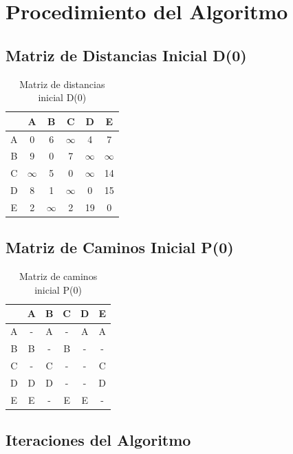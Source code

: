 \documentclass[12pt]{article}
\begin{document}
\clearpage
\section{Procedimiento del Algoritmo}
\subsection{Matriz de Distancias Inicial D(0)}
\begin{table}[h!]
\centering
\begin{tabular}{|c|c|c|c|c|c|}
\hline
 & A & B & C & D & E \\\hline
A & 0 & 6 & $\infty$ & 4 & 7 \\\hline
B & 9 & 0 & 7 & $\infty$ & $\infty$ \\\hline
C & $\infty$ & 5 & 0 & $\infty$ & 14 \\\hline
D & 8 & 1 & $\infty$ & 0 & 15 \\\hline
E & 2 & $\infty$ & 2 & 19 & 0 \\\hline
\end{tabular}
\caption{Matriz de distancias inicial D(0)}
\end{table}

\clearpage
\subsection{Matriz de Caminos Inicial P(0)}
\begin{table}[h!]
\centering
\begin{tabular}{|c|c|c|c|c|c|}
\hline
 & A & B & C & D & E \\\hline
A & - & A & - & A & A \\\hline
B & B & - & B & - & - \\\hline
C & - & C & - & - & C \\\hline
D & D & D & - & - & D \\\hline
E & E & - & E & E & - \\\hline
\end{tabular}
\caption{Matriz de caminos inicial P(0)}
\end{table}

\clearpage
\subsection{Iteraciones del Algoritmo}
\end{document}
